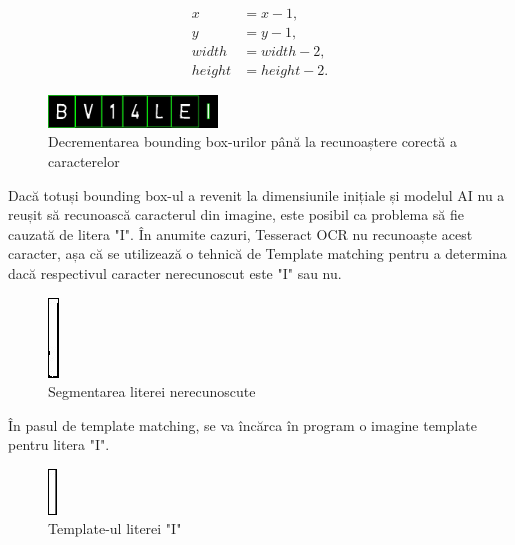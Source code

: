\documentclass[a4paper,12pt]{report}
\begin{document}
\[
    \begin{aligned}
        x      & = x - 1,      \\
        y      & = y - 1,      \\
        width  & = width - 2,  \\
        height & = height - 2.
    \end{aligned}
\]

\begin{figure}[h]
    \centering
    \includegraphics[width=0.4\textwidth]{images/output_ocr.jpg}
    \caption{Decrementarea bounding box-urilor până la recunoaștere corectă a caracterelor}
\end{figure}
\FloatBarrier

Dacă totuși bounding box-ul a revenit la dimensiunile inițiale și modelul AI nu a reușit să recunoască caracterul din imagine, este posibil ca problema să fie cauzată de litera "I". În anumite cazuri, Tesseract OCR nu recunoaște acest caracter, așa că se utilizează o tehnică de Template matching pentru a determina dacă respectivul caracter nerecunoscut este "I" sau nu.

\begin{figure}[h]
    \centering
    \includegraphics[height=0.2\textwidth]{images/i.jpg}
    \caption{Segmentarea literei nerecunoscute}
\end{figure}
\FloatBarrier

În pasul de template matching, se va încărca în program o imagine template pentru litera "I".

\begin{figure}[h]
    \centering
    \includegraphics[height=0.2\textwidth]{images/template.jpg}
    \caption{Template-ul literei "I"}
\end{figure}
\FloatBarrier
\end{document}
